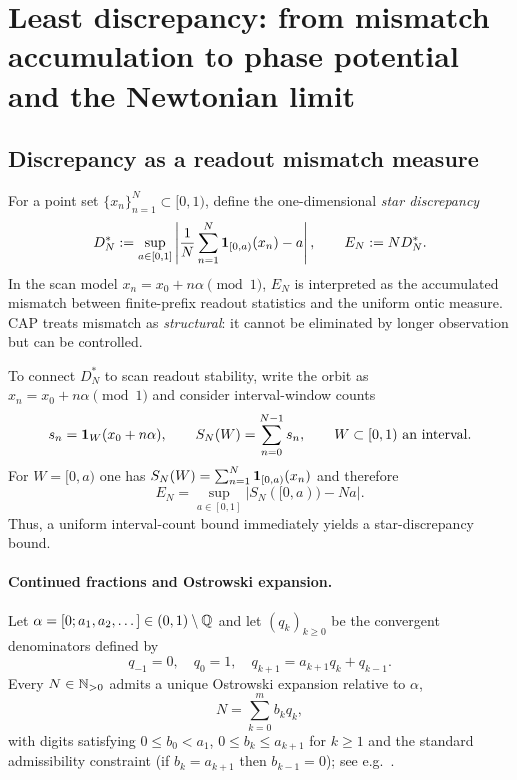 \section{Least discrepancy: from mismatch accumulation to phase potential and the Newtonian limit}
\label{sec:least_discrepancy}

\subsection{Discrepancy as a readout mismatch measure}
\label{subsec:discrepancy_definition}

For a point set $\{x_n\}_{n=1}^N\subset[0,1)$, define the one-dimensional \emph{star discrepancy} \cite{KuipersNiederreiter1974}
\begin{equation}
  D_N^{\ast} := \sup_{a\in[0,1]}\left|\frac{1}{N}\sum_{n=1}^N \mathbf{1}_{[0,a)}(x_n) - a\right|,
  \qquad
  E_N := N D_N^{\ast}.
\end{equation}
In the scan model $x_n=x_0+n\alpha\pmod{1}$, $E_N$ is interpreted as the accumulated mismatch between finite-prefix readout statistics and the uniform ontic measure. CAP treats mismatch as \emph{structural}: it cannot be eliminated by longer observation but can be controlled.

To connect $D_N^\ast$ to scan readout stability, write the orbit as $x_n=x_0+n\alpha\pmod 1$ and consider interval-window counts
\begin{equation}
  s_n = \mathbf{1}_W(x_0+n\alpha),
  \qquad
  S_N(W)=\sum_{n=0}^{N-1}s_n,
  \qquad
  W\subset[0,1)\ \text{an interval}.
\end{equation}
For $W=[0,a)$ one has $S_N(W)=\sum_{n=1}^N \mathbf{1}_{[0,a)}(x_n)$ and therefore
\begin{equation}
  E_N = \sup_{a\in[0,1]}\left|S_N([0,a)) - Na\right|.
\end{equation}
Thus, a uniform interval-count bound immediately yields a star-discrepancy bound.

\paragraph{Continued fractions and Ostrowski expansion.}
Let $\alpha=[0;a_1,a_2,\dots]\in(0,1)\setminus\mathbb{Q}$ and let $(q_k)_{k\ge 0}$ be the convergent denominators defined by
\begin{equation}
  q_{-1}=0,\quad q_0=1,\quad q_{k+1}=a_{k+1}q_k+q_{k-1}.
\end{equation}
Every $N\in\mathbb{N}_{>0}$ admits a unique Ostrowski expansion relative to $\alpha$,
\begin{equation}
  N=\sum_{k=0}^m b_k q_k,
\end{equation}
with digits satisfying $0\le b_0<a_1$, $0\le b_k\le a_{k+1}$ for $k\ge 1$ and the standard admissibility constraint (if $b_k=a_{k+1}$ then $b_{k-1}=0$); see e.g.\ \cite{AlloucheShallit2003,Lothaire2002}.

